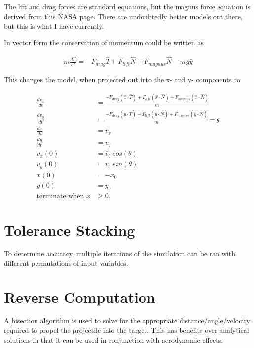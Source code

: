 \documentclass[10pt,letterpaper]{article}
\begin{document}
	The lift and drag forces are standard equations, but the magnus force equation is derived from \href{https://www.grc.nasa.gov/WWW/K-12/airplane/beach.html}{\underline{this NASA page}}. There are undoubtedly better models out there, but this is what I have currently.

	In vector form the conservation of momentum could be written as

	\begin{align}
		m \frac{d \vec{v}}{d t} = - F_{drag} \hat{T} + F_{lift} \hat{N} + F_{magnus} \hat{N} - m g \hat{y}
	\end{align}

	This changes the model, when projected out into the x- and y- components to

	\begin{align}
		\frac{d v_x}{d t} &= \frac{- F_{drag} (\hat{x} \cdot \hat{T}) + F_{lift} (\hat{x} \cdot \hat{N}) + F_{magnus} (\hat{x} \cdot \hat{N})}{m}\\
		\frac{d v_y}{d t} &= \frac{ - F_{drag} (\hat{y} \cdot \hat{T}) + F_{lift} (\hat{y} \cdot \hat{N}) + F_{magnus} (\hat{y} \cdot \hat{N})}{m} - g \\
		\frac{d x}{d t} &= v_x \\
		\frac{d y}{d t} &= v_y \\
		v_x(0) &= \bar{v}_0 \ cos(\theta) \\
		v_y(0) &= \bar{v}_0 \ sin(\theta) \\
		x(0) &= -x_0 \\
		y(0) &= y_0 \\
		\text{terminate when } x &\geq 0 .
	\end{align}

\section{Tolerance Stacking}
	To determine accuracy, multiple iterations of the simulation can be ran with different permutations of input variables.

\section{Reverse Computation}
	A \href{https://en.wikipedia.org/wiki/Bisection_method}{\underline{bisection algorithm}} is used to solve for the appropriate distance/angle/velocity required to propel the projectile into the target. This has benefits over analytical solutions in that it can be used in conjunction with aerodynamic effects.
\end{document}
